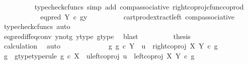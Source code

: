 \begin{isabellebody}
\ \ \ \ \ \ \ \ \isamarkupfalse%
\ {\isacharparenleft}{\kern0pt}typecheck{\isacharunderscore}{\kern0pt}cfuncs{\isacharcomma}{\kern0pt}\ simp\ add{\isacharcolon}{\kern0pt}\ comp{\isacharunderscore}{\kern0pt}associative{}\ right{\isacharunderscore}{\kern0pt}coproj{\isacharunderscore}{\kern0pt}cfunc{\isacharunderscore}{\kern0pt}coprod{\isacharparenright}{\kern0pt}\isanewline
\ \ \ \ \ \ \isamarkupfalse%
\ \isamarkupfalse%
\ {\isachardoublequoteopen}{\isachardot}{\kern0pt}{\isachardot}{\kern0pt}{\isachardot}{\kern0pt}\ {\isacharequal}{\kern0pt}\ eq{\isacharunderscore}{\kern0pt}pred\ Y\ {\isasymcirc}\isactrlsub c\ {\isasymlangle}g{\isacharcomma}{\kern0pt}y{\isasymrangle}{\isachardoublequoteclose}\isanewline
\ \ \ \ \ \ \ \ \isamarkupfalse%
\ cart{\isacharunderscore}{\kern0pt}prod{\isacharunderscore}{\kern0pt}extract{\isacharunderscore}{\kern0pt}left\ comp{\isacharunderscore}{\kern0pt}associative{}\ \isamarkupfalse%
\ {\isacharparenleft}{\kern0pt}typecheck{\isacharunderscore}{\kern0pt}cfuncs{\isacharcomma}{\kern0pt}\ auto{\isacharparenright}{\kern0pt}\isanewline
\ \ \ \ \ \ \isamarkupfalse%
\ \isamarkupfalse%
\ {\isachardoublequoteopen}{\isachardot}{\kern0pt}{\isachardot}{\kern0pt}{\isachardot}{\kern0pt}\ {\isacharequal}{\kern0pt}\ {\isasymf}{\isachardoublequoteclose}\isanewline
\ \ \ \ \ \ \ \ \isamarkupfalse%
\ eq{\isacharunderscore}{\kern0pt}pred{\isacharunderscore}{\kern0pt}iff{\isacharunderscore}{\kern0pt}eq{\isacharunderscore}{\kern0pt}conv\ y{\isacharunderscore}{\kern0pt}not{\isacharunderscore}{\kern0pt}g\ y{\isacharunderscore}{\kern0pt}type\ g{\isacharunderscore}{\kern0pt}type\ \isamarkupfalse%
\ blast\isanewline
\ \ \ \ \ \ \isamarkupfalse%
\ \isamarkupfalse%
\ {\isacharquery}{\kern0pt}thesis\isanewline
\ \ \ \ \ \ \ \ \isamarkupfalse%
\ calculation\ \isamarkupfalse%
\ auto\isanewline
\ \ \ \ \isamarkupfalse%
\isanewline
\ \ \isamarkupfalse%
\isanewline
\ \ \ \ \isamarkupfalse%
\ {\isachardoublequoteopen}{\isasymforall}g{\isachardot}{\kern0pt}\ g\ {\isasymin}\isactrlsub c\ Y\ {\isasymlongrightarrow}\ u\ {\isasymnoteq}\ right{\isacharunderscore}{\kern0pt}coproj\ X\ Y\ {\isasymcirc}\isactrlsub c\ g{\isachardoublequoteclose}\isanewline
\ \ \ \ \isamarkupfalse%
\ \isamarkupfalse%
\ g\ \ g{\isacharunderscore}{\kern0pt}type{\isacharbrackleft}{\kern0pt}type{\isacharunderscore}{\kern0pt}rule{\isacharbrackright}{\kern0pt}{\isacharcolon}{\kern0pt}\ {\isachardoublequoteopen}g\ {\isasymin}\isactrlsub c\ X{\isachardoublequoteclose}\ \ u{\isacharunderscore}{\kern0pt}left{\isacharunderscore}{\kern0pt}coproj{\isacharcolon}{\kern0pt}\ {\isachardoublequoteopen}u\ {\isacharequal}{\kern0pt}\ left{\isacharunderscore}{\kern0pt}coproj\ X\ Y\ {\isasymcirc}\isactrlsub c\ g{\isachardoublequoteclose}\isanewline

\end{isabellebody}
